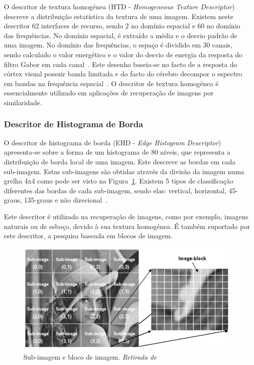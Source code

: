 O descritor de textura homogénea (HTD - \textit{Homogeneous Texture Descriptor}) descreve a distribuição estatística da textura de uma imagem. Existem neste descritor 62 interfaces de recurso, sendo 2 no domínio espacial e 60 no domínio das frequências. No domínio espacial, é extraído a média e o desvio padrão de uma imagem. No domínio das frequências, o espaço é dividido em 30 canais, sendo calculado o valor energético e o valor do desvio de energia da resposta do filtro Gabor em cada canal~\cite{Wu2001, Shao2009}. Este desenho baseia-se no facto de a resposta do córtex visual possuir banda limitada e do facto do cérebro decompor o espectro em bandas na frequência espacial~\cite{Wu2001}.
O descritor de textura homogénea é essencialmente utilizado em aplicações de recuperação de imagens por similaridade. 

\subsubsection{Descritor de Histograma de Borda}

O descritor de histograma de borda (EHD - \textit{Edge Histogram Descriptor}) apresenta-se sobre a forma de um histograma de 80 níveis, que representa a distribuição de borda local de uma imagem. Este descreve as bordas em cada sub-imagem. Estas sub-imagens são obtidas através da divisão da imagem numa grelha 4x4 como pode ser visto na Figura~\ref{fig:ehd}. Existem 5 tipos de classificação diferentes das bordas de cada sub-imagem, sendo elas: vertical, horizontal, 45-graus, 135-graus e não direcional~\cite{Wu2001}. 

Este descritor é utilizado na recuperação de imagens, como por exemplo, imagens naturais ou de esboço, devido à sua textura homogénea. É também suportado por este descritor, a pesquisa baseada em blocos de imagem.  

\begin{figure}
\centering
\includegraphics[width=0.7\linewidth]{./figures/ehd}
\caption{Sub-imagem e bloco de imagem. \textit{Retirada de}~\cite{Wu2001}}
\label{fig:ehd}
\end{figure}


